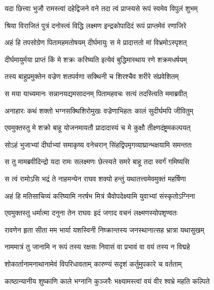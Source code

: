 \twolineshloka
{यदा छित्त्वा भुजौ रामस्त्वां दहेद्विजने वने}
{तदा त्वं प्राप्स्यसे रूपं स्वमेव विपुलं शुभम्} %

\twolineshloka
{श्रिया विराजितं पुत्रं दनोस्त्वं विद्धि लक्ष्मण}
{इन्द्रकोपादिदं रूपं प्राप्तमेवं रणाजिरे} %

\twolineshloka
{अहं हि तपसोग्रेण पितामहमतोषयम्}
{दीर्घमायुः स मे प्रादात्ततो मां विभ्रमोऽस्पृशत्} %

\twolineshloka
{दीर्घमायुर्मया प्राप्तं किं मे शक्रः करिष्यति}
{इत्येवं बुद्धिमास्थाय रणे शक्रमधर्षयम्} %

\twolineshloka
{तस्य बाहुप्रमुक्तेन वज्रेण शतपर्वणा}
{सक्थिनी च शिरश्चैव शरीरे संप्रवेशितम्} %

\twolineshloka
{स मया याच्यमानः सन्नानयद्यमसादनम्}
{पितामहवचः सत्यं तदस्त्विति ममाब्रवीत्} %

\twolineshloka
{अनाहारः कथं शक्तो भग्नसक्थिशिरोमुखः}
{वज्रेणाभिहतः कालं सुदीर्घमपि जीवितुम्} %

\twolineshloka
{एवमुक्तस्तु मे शक्रो बाहू योजनमायतौ}
{प्रादादास्यं च मे कुक्षौ तीक्ष्णदंष्ट्रमकल्पयत्} %

\twolineshloka
{सोऽहं भुजाभ्यां दीर्घाभ्यां समाकृष्य वनेचरान्}
{सिंहद्विपमृगव्याघ्रान्भक्षयामि समन्ततः} %

\twolineshloka
{स तु मामब्रवीदिन्द्रो यदा रामः सलक्ष्मणः}
{छेत्स्यते समरे बाहू तदा स्वर्गं गमिष्यसि} %

\twolineshloka
{स त्वं रामोऽसि भद्रं ते नाहमन्येन राघव}
{शक्यो हन्तुं यथातत्त्वमेवमुक्तं महर्षिणा} %

\twolineshloka
{अहं हि मतिसाचिव्यं करिष्यामि नरर्षभ}
{मित्रं चैवोपदेक्ष्यामि युवाभ्यां संस्कृतोऽग्निना} %

\twolineshloka
{एवमुक्तस्तु धर्मात्मा दनुना तेन राघवः}
{इदं जगाद वचनं लक्ष्मणस्योपशृण्वतः} %

\twolineshloka
{रावणेन हृता सीता मम भार्या यशस्विनी}
{निष्क्रान्तस्य जनस्थानात्सह भ्रात्रा यथासुखम्} %

\twolineshloka
{नाममात्रं तु जानामि न रूपं तस्य रक्षसः}
{निवासं वा प्रभावं वा वयं तस्य न विद्महे} %

\twolineshloka
{शोकार्तानामनाथानामेवं विपरिधावताम्}
{कारुण्यं सदृशं कर्तुमुपकारे च वर्तताम्} %

\twolineshloka
{काष्ठान्यानीय शुष्काणि काले भग्नानि कुञ्जरैः}
{भक्ष्यामस्त्वां वयं वीर श्वभ्रे महति कल्पिते} %

